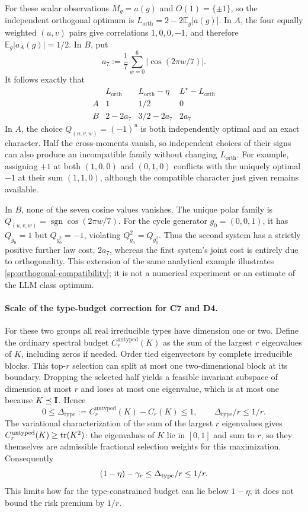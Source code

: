 For these scalar observations $M_g=a(g)$ and $O(1)=\{\pm1\}$, so the independent orthogonal optimum is
$L_{\mathrm{orth}}=2-2\mathbb E_g|a(g)|$.
In $A$, the four equally weighted $(u,v)$ pairs give correlations $1,0,0,-1$, and therefore $\mathbb E_g|a_A(g)|=1/2$. In $B$, put
\[
 a_7:=\frac17\sum_{w=0}^6|\cos(2\pi w/7)|.
\]
It follows exactly that
\[
\begin{array}{c|ccc}
 & L_{\mathrm{orth}} & L_{\mathrm{orth}}-\eta & L^\star-L_{\mathrm{orth}}\\
 \hline
 A & 1 & 1/2 & 0\\
 B & 2-2a_7 & 3/2-2a_7 & 2a_7
\end{array}
\]
In $A$, the choice $Q_{(u,v,w)}=(-1)^u$ is both independently optimal and an exact character. Half the cross-moments vanish, so independent choices of their signs can also produce an incompatible family without changing $L_{\mathrm{orth}}$. For example, assigning $+1$ at both $(1,0,0)$ and $(0,1,0)$ conflicts with the uniquely optimal $-1$ at their sum $(1,1,0)$, although the compatible character just given remains available.

In $B$, none of the seven cosine values vanishes. The unique polar family is $Q_{(u,v,w)}=\operatorname{sgn}\cos(2\pi w/7)$. For the cycle generator $g_0=(0,0,1)$, it has $Q_{g_0}=1$ but $Q_{g_0^2}=-1$, violating $Q_{g_0}^2=Q_{g_0^2}$. Thus the second system has a strictly positive further law cost, $2a_7$, whereas the first system's joint cost is entirely due to orthogonality. This extension of the same analytical example illustrates \cref{sp:orthogonal-compatibility}; it is not a numerical experiment or an estimate of the LLM class optimum.

\paragraph{Scale of the type-budget correction for C7 and D4.}
\label{sp:type-scale}
For these two groups all real irreducible types have dimension one or two. Define the ordinary spectral budget $C_r^{\mathrm{untyped}}(K)$ as the sum of the largest $r$ eigenvalues of $K$, including zeros if needed. Order tied eigenvectors by complete irreducible blocks. This top-$r$ selection can split at most one two-dimensional block at its boundary. Dropping the selected half yields a feasible invariant subspace of dimension at most $r$ and loses at most one eigenvalue, which is at most one because $K\preceq\mathbf{I}$. Hence
\[
 0\le \Delta_{\mathrm{type}}
 :=C_r^{\mathrm{untyped}}(K)-C_r(K)\le1,
 \qquad \Delta_{\mathrm{type}}/r\le1/r.
\]
The variational characterization of the sum of the largest $r$ eigenvalues gives $C_r^{\rm untyped}(K)\ge\operatorname{tr}(K^2)$: the eigenvalues of $K$ lie in $[0,1]$ and sum to $r$, so they themselves are admissible fractional selection weights for this maximization. Consequently
\[
 (1-\eta)-\gamma_r\le\Delta_{\rm type}/r\le1/r.
\]
This limits how far the type-constrained budget can lie below $1-\eta$; it does not bound the risk premium by $1/r$.

